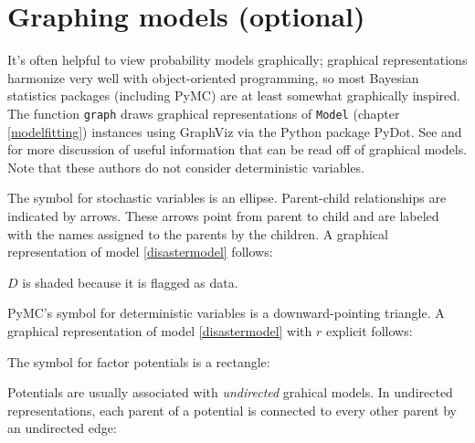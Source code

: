 \section{Graphing models (optional)}
\label{sec:graphical}

It's often helpful to view probability models graphically; graphical representations harmonize very well with object-oriented programming, so most Bayesian statistics packages (including PyMC) are at least somewhat graphically inspired. The function \texttt{graph} draws graphical representations of \texttt{Model} (chapter \ref{modelfitting}) instances using GraphViz via the Python package PyDot. See \cite{dawidmarkov} and \cite{jordangraphical} for more discussion of useful information that can be read off of graphical models. Note that these authors do not consider deterministic variables.

The symbol for stochastic variables is an ellipse. Parent-child relationships are indicated by arrows. These arrows point from parent to child and are labeled with the names assigned to the parents by the children. A graphical representation of model \ref{disastermodel} follows:
\begin{center}
\end{center} 
$D$ is shaded because it is flagged as data.

PyMC's symbol for deterministic variables is a downward-pointing triangle. A graphical representation of model \ref{disastermodel} with $r$ explicit follows:
\begin{center}
\end{center}

The symbol for factor potentials is a rectangle:
\begin{center}
\end{center}
Potentials are usually associated with \emph{undirected} grahical models. In undirected representations, each parent of a potential is connected to every other parent by an undirected edge:
\begin{center}
\end{center}

